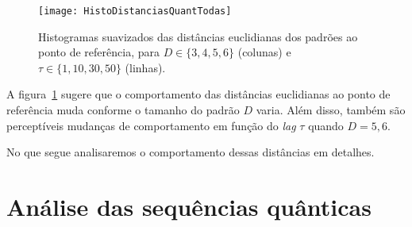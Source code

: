 %
%
%

\begin{figure}[hbt]
\centering
\texttt{[image: HistoDistanciasQuantTodas]}
\caption{Histogramas suavizados das distâncias euclidianas dos padrões ao ponto de referência, para $D\in\{3,4,5,6\}$ (colunas) e $\tau\in\{1,10,30,50\}$ (linhas).}\label{Fig:HistoDistanciasQuantTodas}
\end{figure}

A figura~\ref{Fig:HistoDistanciasQuantTodas} sugere que o comportamento das distâncias euclidianas ao ponto de referência muda conforme o tamanho do padrão $D$ varia.
Além disso, também são perceptíveis mudanças de comportamento em função do \textit{lag} $\tau$ quando $D=5,6$.

No que segue analisaremos o comportamento dessas distâncias em detalhes.

\section{Análise das sequências quânticas}

